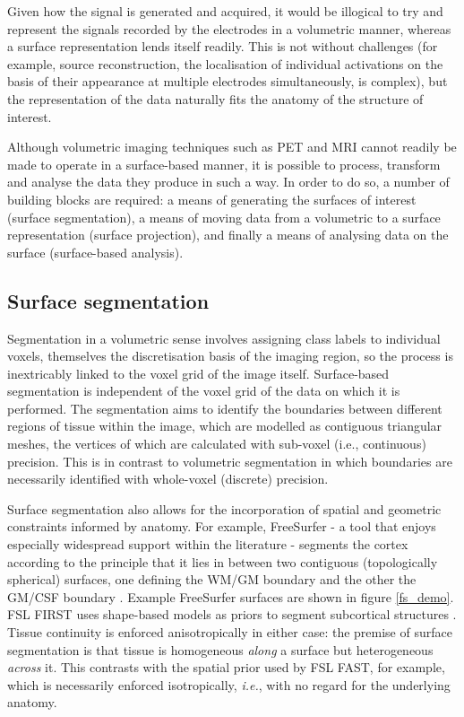 Given how the signal is generated and acquired, it would be illogical to try and represent the signals recorded by the electrodes in a volumetric manner, whereas a surface representation lends itself readily. This is not without challenges (for example, source reconstruction, the localisation of individual activations on the basis of their appearance at multiple electrodes simultaneously, is complex), but the representation of the data naturally fits the anatomy of the structure of interest. 

Although volumetric imaging techniques such as PET and MRI cannot readily be made to operate in a surface-based manner, it is possible to process, transform and analyse the data they produce in such a way. In order to do so, a number of building blocks are required: a means of generating the surfaces of interest (surface segmentation), a means of moving data from a volumetric to a surface representation (surface projection), and finally a means of analysing data on the surface (surface-based analysis). 

\subsection{Surface segmentation}
\label{surface_segmentation}

Segmentation in a volumetric sense involves assigning class labels to individual voxels, themselves the discretisation basis of the imaging region, so the process is inextricably linked to the voxel grid of the image itself. Surface-based segmentation is independent of the voxel grid of the data on which it is performed. The segmentation aims to identify the boundaries between different regions of tissue within the image, which are modelled as contiguous triangular meshes, the vertices of which are calculated with sub-voxel (i.e., continuous) precision. This is in contrast to volumetric segmentation in which boundaries are necessarily identified with whole-voxel (discrete) precision. 

Surface segmentation also allows for the incorporation of spatial and geometric constraints informed by anatomy. For example, FreeSurfer - a tool that enjoys especially widespread support within the literature - segments the cortex according to the principle that it lies in between two contiguous (topologically spherical) surfaces, one defining the WM/GM boundary and the other the GM/CSF boundary \cite{Fischl2012}. Example FreeSurfer surfaces are shown in figure \ref{fs_demo}. FSL FIRST uses shape-based models as priors to segment subcortical structures \cite{Patenaude2011}. Tissue continuity is enforced anisotropically in either case: the premise of surface segmentation is that tissue is homogeneous \textit{along} a surface but heterogeneous \textit{across} it. This contrasts with the spatial prior used by FSL FAST, for example, which is necessarily enforced isotropically, \textit{i.e.}, with no regard for the underlying anatomy. 

